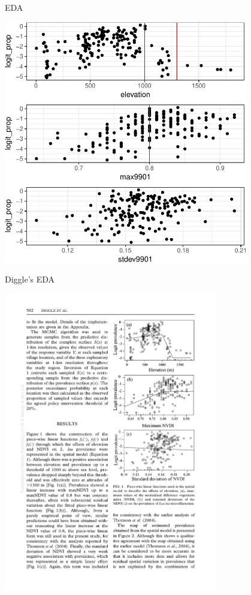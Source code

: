 \documentclass[11pt,ignorenonframetext,]{beamer}
\begin{document}
\begin{frame}{EDA}

\begin{center}\includegraphics[width=0.8\textwidth]{Lec21_files/figure-beamer/unnamed-chunk-3-1} \end{center}

\end{frame}

\begin{frame}{Diggle's EDA}

\begin{center}
\includegraphics[width=0.7\textwidth]{figs/diggle_eda.pdf} \\
\end{center}

\end{frame}
\end{document}
